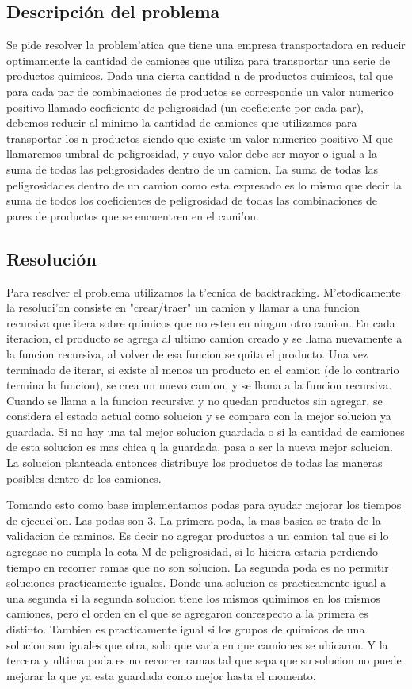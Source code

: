 \subsection{Descripci\'on del problema}

Se pide resolver la problem'atica que tiene una empresa transportadora en reducir optimamente la cantidad de camiones que utiliza para transportar una serie de productos quimicos. 
Dada una cierta cantidad n de productos quimicos, tal que para cada par de combinaciones de productos se corresponde un valor numerico positivo llamado coeficiente de peligrosidad (un coeficiente por cada par), debemos reducir al minimo la cantidad de camiones que utilizamos para transportar los n productos siendo que existe un valor numerico positivo M que llamaremos umbral de peligrosidad, y cuyo valor debe ser mayor o igual a la suma de todas las peligrosidades dentro de un camion. La suma de todas las peligrosidades dentro de un camion como esta expresado es lo mismo que decir la suma de todos los coeficientes de peligrosidad de todas las combinaciones de pares de productos que se encuentren en el cami'on.

\subsection{Resoluci\'on}

Para resolver el problema utilizamos la t'ecnica de backtracking. 
M'etodicamente la resoluci'on consiste en "crear/traer" un camion y llamar a una funcion recursiva que itera sobre quimicos que no esten en ningun otro camion. En cada iteracion, el producto se agrega al ultimo camion creado y se llama nuevamente a la funcion recursiva, al volver de esa funcion se quita el producto. Una vez terminado de iterar, si existe al menos un producto en el camion (de lo contrario termina la funcion), se crea un nuevo camion, y se llama a la funcion recursiva.
Cuando se llama a la funcion recursiva y no quedan productos sin agregar, se considera el estado actual como solucion y se compara con la mejor solucion ya guardada. Si no hay una tal mejor solucion guardada o si la cantidad de camiones de esta solucion es mas chica q la guardada, pasa a ser la nueva mejor solucion.
La solucion planteada entonces distribuye los productos de todas las maneras posibles dentro de los camiones. 

Tomando esto como base implementamos podas para ayudar mejorar los tiempos de ejecuci'on. Las podas son 3. 
La primera poda, la mas basica se trata de la validacion de caminos. Es decir no agregar productos a un camion tal que si lo agregase no cumpla la cota M de peligrosidad, si lo hiciera estaria perdiendo tiempo en recorrer ramas que no son solucion.
La segunda poda es no permitir soluciones practicamente iguales. Donde una solucion es practicamente igual a una segunda si la segunda solucion tiene los mismos quimimos en los mismos camiones, pero el orden en el que se agregaron conrespecto a la primera es distinto. Tambien es practicamente igual si los grupos de quimicos de una solucion son iguales que otra, solo que varia en que camiones se ubicaron.
Y la tercera y ultima poda es no recorrer ramas tal que sepa que su solucion no puede mejorar la que ya esta guardada como mejor hasta el momento.

